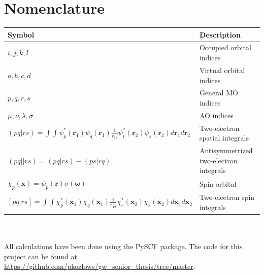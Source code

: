 \documentclass[12pt]{caltech_thesis}
\begin{document}
\tableofcontents
\listoffigures
\listoftables
\printnomenclature

\mainmatter

\chapter{Nomenclature}
\label{chap:nomenclature}
\begin{tabular}{p{} p{}}
Symbol & Description \\
\hline
\(i,j,k,l\) & Occupied orbital indices \\
\(a,b,c,d\) & Virtual orbital indices \\
\(p,q,r,s\) & General MO indices \\
\(\mu,\nu,\lambda,\sigma\) & AO indices \\
\((pq|rs) = \int \int \psi_p^*(\mathbf{r}_1)\psi_q(\mathbf{r}_1)\frac{1}{r_{12}}\psi_r^*(\mathbf{r}_2)\psi_s(\mathbf{r}_2)d\mathbf{r}_1d\mathbf{r}_2\) & Two-electron spatial integrals\\
\((pq||rs) = (pq|rs) - (ps|rq)\) & Antisymmetrized two-electron integrals \\
\(\chi _p (\mathbf{x}) = \psi _p (\mathbf{r})\sigma (\mathbf{\omega })\) & Spin-orbital \\
\([pq|rs] = \int \int \chi_p^*(\mathbf{x}_1)\chi_q(\mathbf{x}_1)\frac{1}{r_{12}}\chi_r^*(\mathbf{x}_2)\chi_s(\mathbf{x}_2)d\mathbf{x}_1d\mathbf{x}_2\) & Two-electron spin integrals \\

\end{tabular}\\\\
All calculations have been done using the PySCF package.\autocite{sun_recent_2020} The code for this project can be found at \url{https://github.com/pkozlows/gw_senior_thesis/tree/master}.
\end{document}
